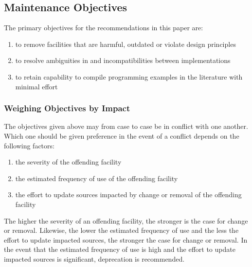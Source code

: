 \documentclass[10pt,a4paper]{article} %
\begin{document}
\subsection{Maintenance Objectives}

The primary objectives for the recommendations in this paper are:

\renewcommand{\labelenumi}{(\arabic{enumi})}
\begin{enumerate}[itemindent=-0.75em]
\item to remove facilities that are harmful, outdated or violate design principles
\item to resolve ambiguities in \cite{Wirth88} and incompatibilities between implementations
\item to retain capability to compile programming examples in the literature with minimal effort
\end{enumerate}

\subsubsection{Weighing Objectives by Impact}

\noindent The objectives given above may from case to case be in conflict with one another. Which one should be given preference in the event of a conflict depends on the following factors:

\begin{enumerate}[itemindent=-0.75em]
\item the severity of the offending facility
\item the estimated frequency of use of the offending facility
\item the effort to update sources impacted by change or removal of the offending facility
\end{enumerate}

\noindent The higher the severity of an offending facility, the stronger is the case for change or removal. Likewise, the lower the estimated frequency of use and the less the effort to update impacted sources, the stronger the case for change or removal. In the event that the estimated frequency of use is high and the effort to update impacted sources is significant, deprecation is recommended.


\end{document}
